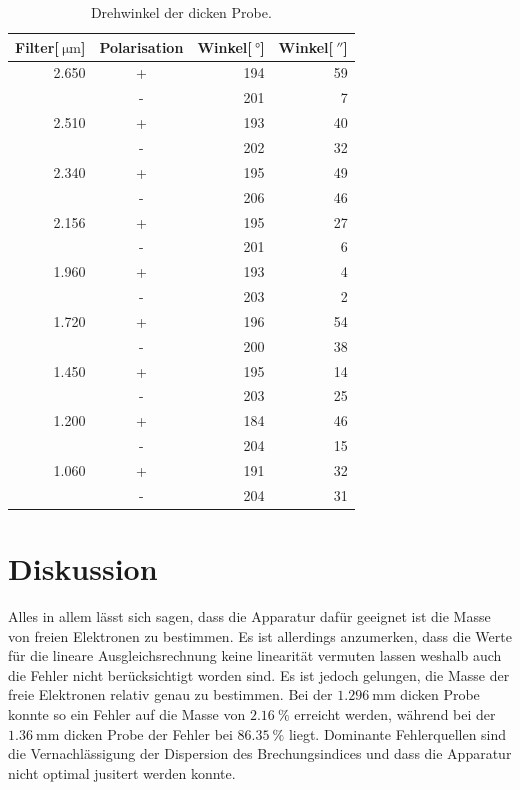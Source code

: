 \begin{table}
	\centering
	\caption[]{Drehwinkel der dicken Probe.}
	\begin{tabular}{r c r r }
		Filter[$\SI{}{\micro\meter}$] & Polarisation & Winkel[$\SI{}{\degree}$] & Winkel[$\SI{}{\arcsecond}$]\\
		\hline\hline
		2.650	&	+	&	194	&	59\\
				&	-	&	201	&	 7\\
		2.510	&	+	&	193	&	40\\
				&	-	&	202	&	32\\
		2.340	&	+	&	195	&	49\\
				&	-	&	206	&	46\\
		2.156	&	+	&	195	&	27\\
				&	-	&	201	&	 6\\
		1.960	&	+	&	193	&	 4\\
				&	-	&	203	&	 2\\
		1.720	&	+	&	196	&	54\\
				&	-	&	200	&	38\\
		1.450	&	+	&	195	&	14\\
				&	-	&	203	&	25\\
		1.200	&	+	&	184	&	46\\
				&	-	&	204	&	15\\
		1.060	&	+	&	191	&	32\\
				&	-	&	204	&	31\\
		\hline
	\end{tabular}
	\label{tab_2}
\end{table}

\section{Diskussion} %
\label{sec:diskussion}

Alles in allem lässt sich sagen, dass die Apparatur dafür geeignet ist die Masse von freien Elektronen zu bestimmen.
Es ist allerdings anzumerken, dass die Werte für die lineare Ausgleichsrechnung keine linearität vermuten lassen weshalb auch die Fehler nicht berücksichtigt worden sind.
Es ist jedoch gelungen, die Masse der freie Elektronen relativ genau zu bestimmen.
Bei der $\SI{1.296}{\milli\meter}$ dicken Probe konnte so ein Fehler auf die Masse von $\SI{2.16}{\percent}$ erreicht werden, während bei der $\SI{1.36}{\milli\meter}$ dicken Probe der Fehler bei $\SI{86.35}{\percent}$ liegt.
Dominante Fehlerquellen sind die Vernachlässigung der Dispersion des Brechungsindices und dass die Apparatur nicht optimal jusitert werden konnte.